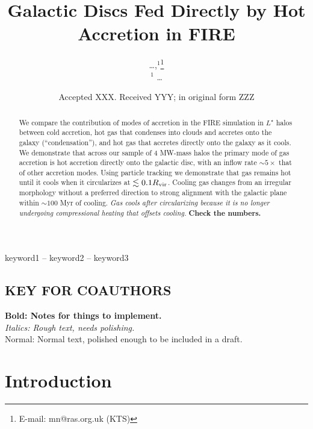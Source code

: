 \documentclass[fleqn,usenatbib]{mnras}
\title[Hot Accretion in FIRE]{Galactic Discs Fed Directly by Hot Accretion in FIRE}
\author[\ldots]{
\ldots,$^{1}$\thanks{E-mail: mn@ras.org.uk (KTS)}
\\
$^1$ \ldots
}
\date{Accepted XXX. Received YYY; in original form ZZZ}
\begin{document}
\label{firstpage}
\pagerange{\pageref{firstpage}--\pageref{lastpage}}
\maketitle

\begin{abstract}

We compare the contribution of modes of accretion in the FIRE simulation in $L^\star$ halos between cold accretion, hot gas that condenses into clouds and accretes onto the galaxy (``condensation''), and hot gas that accretes directly onto the galaxy as it cools.
We demonstrate that across our sample of 4 MW-mass halos the primary mode of gas accretion is hot accretion directly onto the galactic disc, with an inflow rate $\sim 5\times$ that of other accretion modes.
Using particle tracking we demonstrate that gas remains hot until it cools when it circularizes at $\lesssim 0.1 R_{\rm vir}$.
Cooling gas changes from an irregular morphology without a preferred direction to strong alignment with the galactic plane within $\sim 100$ Myr of cooling.
\textit{Gas cools after circularizing because it is no longer undergoing compressional heating that offsets cooling.}
\textbf{Check the numbers.}

\end{abstract}

\begin{keywords}
keyword1 -- keyword2 -- keyword3
\end{keywords}



\subsection{ KEY FOR COAUTHORS}
\textbf{Bold: Notes for things to implement.} \\
\textit{Italics: Rough text, needs polishing.} \\
Normal: Normal text, polished enough to be included in a draft.

\section{Introduction}
\end{document}
